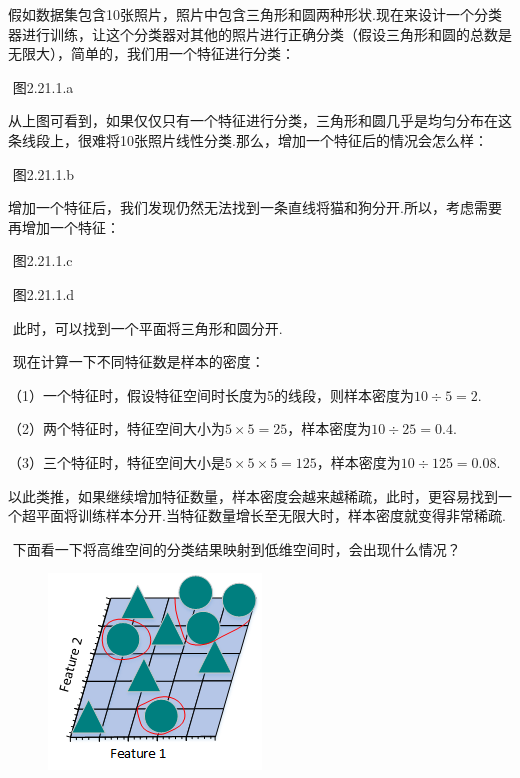 ​
假如数据集包含10张照片，照片中包含三角形和圆两种形状.现在来设计一个分类器进行训练，让这个分类器对其他的照片进行正确分类（假设三角形和圆的总数是无限大），简单的，我们用一个特征进行分类：

 

​ 图2.21.1.a

​
从上图可看到，如果仅仅只有一个特征进行分类，三角形和圆几乎是均匀分布在这条线段上，很难将10张照片线性分类.那么，增加一个特征后的情况会怎么样：

 

​ 图2.21.1.b

增加一个特征后，我们发现仍然无法找到一条直线将猫和狗分开.所以，考虑需要再增加一个特征：

 

​ 图2.21.1.c

 

​ 图2.21.1.d

​ 此时，可以找到一个平面将三角形和圆分开.

​ 现在计算一下不同特征数是样本的密度：

​
（1）一个特征时，假设特征空间时长度为5的线段，则样本密度为$10 \div 5 = 2$.

​ （2）两个特征时，特征空间大小为$ 5\times5 =
25$，样本密度为$10 \div 25 = 0.4$.

​ （3）三个特征时，特征空间大小是$ 5\times5\times5 =
125$，样本密度为$10 \div 125 = 0.08$.

​
以此类推，如果继续增加特征数量，样本密度会越来越稀疏，此时，更容易找到一个超平面将训练样本分开.当特征数量增长至无限大时，样本密度就变得非常稀疏.

​ 下面看一下将高维空间的分类结果映射到低维空间时，会出现什么情况？

\begin{figure}
\centering
\includegraphics{./img/ch2/2.21.1.5.png}
 
\end{figure}

